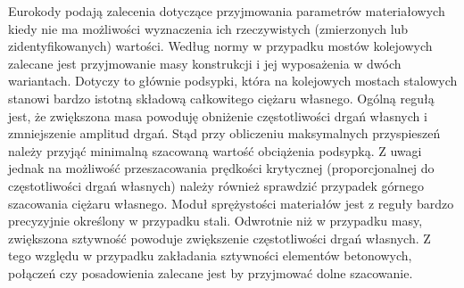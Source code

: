 Eurokody \cite{PKNg, PKNj} podają zalecenia dotyczące przyjmowania parametrów materiałowych kiedy nie ma możliwości wyznaczenia ich rzeczywistych (zmierzonych lub zidentyfikowanych) wartości. Według normy \cite{PKNj} w przypadku mostów kolejowych zalecane jest przyjmowanie masy konstrukcji i jej wyposażenia w dwóch wariantach. Dotyczy to głównie podsypki, która na kolejowych mostach stalowych stanowi bardzo istotną składową całkowitego ciężaru własnego. Ogólną regułą jest, że zwiększona masa powoduję obniżenie częstotliwości drgań własnych i zmniejszenie amplitud drgań. Stąd przy obliczeniu maksymalnych przyspieszeń należy przyjąć minimalną szacowaną wartość obciążenia podsypką. Z uwagi jednak na możliwość przeszacowania prędkości krytycznej (proporcjonalnej do częstotliwości drgań własnych) należy również sprawdzić przypadek górnego szacowania ciężaru własnego. Moduł sprężystości materiałów jest z reguły bardzo precyzyjnie określony w przypadku stali. Odwrotnie niż w przypadku masy, zwiększona sztywność powoduje zwiększenie częstotliwości drgań własnych. Z tego względu w przypadku zakładania sztywności elementów betonowych, połączeń czy posadowienia zalecane jest by przyjmować dolne szacowanie.

